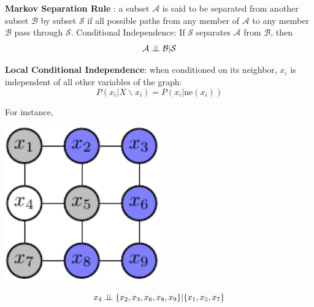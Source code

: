 \begin{theorem}
\textbf{Markov Separation Rule} : a subset $\mathcal{A}$ is said to be separated from another subset $\mathcal{B}$ 
by subset $\mathcal{S}$ if all possible paths from any member of $\mathcal{A}$ to any member $\mathcal{B}$
pass through $\mathcal{S}$. 
 Conditional Independence: If $\mathcal{S}$ separates $\mathcal{A}$ from $\mathcal{B}$, then
 \begin{equation*}
 \mathcal{A} \perp\!\!\!\perp \mathcal{B} | \mathcal{S}
  \end{equation*}
\end{theorem}

\begin{corollary}
\textbf{Local Conditional Independence}:
  when conditioned on its neighbor, $x_i$ is  independent of all other variables of the graph: 
   \begin{equation*}
    P(x_i|X \backslash x_i)= P(x_i|\text{ne}(x_i))
   \end{equation*}
\end{corollary}
For instance,  \newline\newline 
\begin{minipage}[c]{0.5\textwidth}   
	\centering
	\includegraphics[width=0.5\textwidth]{./Figures/markov_net_1.pdf}
\end{minipage}
\begin{minipage}[c]{0.5\textwidth}
   \begin{equation*}
    x_4 \perp\!\!\!\perp \{x_2,x_3,x_6,x_8,x_9 \}|\{x_1,x_5,x_7\}
   \end{equation*}
\end{minipage}

